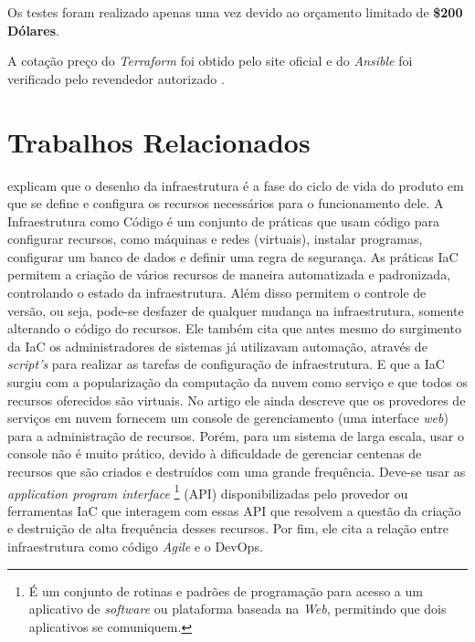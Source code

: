  Os testes foram realizado apenas uma vez devido ao orçamento limitado de \textbf{\$200 Dólares}.

A cotação preço do \textit{Terraform} foi obtido pelo site oficial e do \textit{Ansible} foi verificado pelo revendedor autorizado \cite{opensource.io}.

\section{\esp Trabalhos Relacionados} \label{relacionados}


 explicam que o desenho da infraestrutura é a fase do ciclo de vida do produto em que se define e configura os recursos necessários para o funcionamento dele. A Infraestrutura como Código é um conjunto de práticas que usam código para configurar recursos, como máquinas e redes (virtuais), instalar programas, configurar um banco de dados e definir uma regra de segurança. As práticas IaC permitem a criação de vários recursos de maneira automatizada e padronizada, controlando o estado da infraestrutura. Além disso permitem o controle de versão, ou seja, pode-se desfazer de qualquer mudança na infraestrutura, somente alterando o código do recursos. Ele também cita que antes mesmo do surgimento da IaC os administradores de sistemas já utilizavam automação, através de \textit{script's} para realizar as tarefas de configuração de infraestrutura. E que a IaC surgiu com a popularização da computação da nuvem como serviço e que todos os recursos oferecidos são virtuais. No artigo ele ainda descreve que os provedores de serviços em nuvem fornecem um console de gerenciamento (uma interface \textit{web}) para a administração de recursos. Porém, para um sistema de larga escala, usar o console não é muito prático, devido à dificuldade de gerenciar centenas de recursos que são criados e destruídos com uma grande frequência. Deve-se usar as \textit{application program interface} \footnote{É um conjunto de rotinas e padrões de programação para acesso a um aplicativo de \textit{software} ou plataforma baseada na \textit{Web}, permitindo que dois aplicativos se comuniquem. } (API) disponibilizadas pelo provedor ou ferramentas IaC que interagem com essas API que resolvem a questão da criação e destruição de alta frequência desses recursos. Por fim, ele cita a relação entre infraestrutura como código \textit{Agile} e o DevOps. 

\hfill

